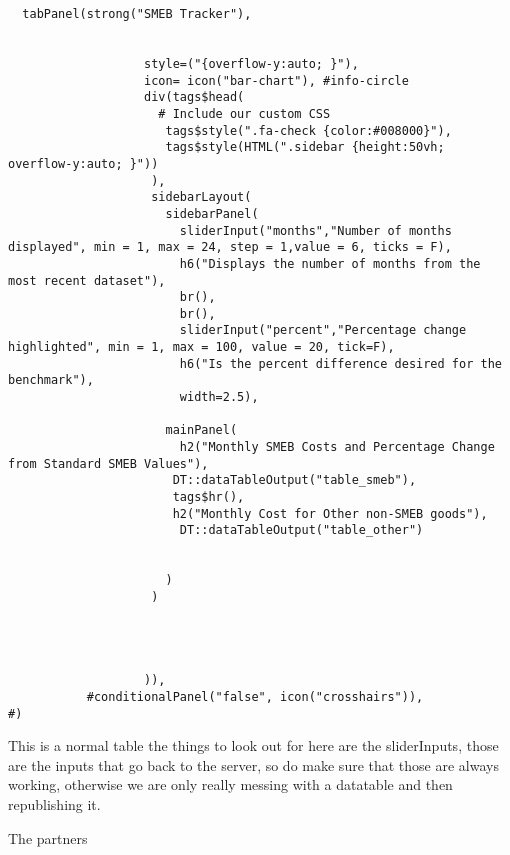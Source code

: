 \documentclass[
]{article}
\begin{document}
\begin{verbatim}
  tabPanel(strong("SMEB Tracker"),
                    
                    
                   style=("{overflow-y:auto; }"), 
                   icon= icon("bar-chart"), #info-circle
                   div(tags$head(
                     # Include our custom CSS
                      tags$style(".fa-check {color:#008000}"),
                      tags$style(HTML(".sidebar {height:50vh; overflow-y:auto; }"))
                    ),
                    sidebarLayout(
                      sidebarPanel(
                        sliderInput("months","Number of months displayed", min = 1, max = 24, step = 1,value = 6, ticks = F),
                        h6("Displays the number of months from the most recent dataset"),
                        br(),
                        br(),
                        sliderInput("percent","Percentage change highlighted", min = 1, max = 100, value = 20, tick=F),
                        h6("Is the percent difference desired for the benchmark"),
                        width=2.5),
                      
                      mainPanel(
                        h2("Monthly SMEB Costs and Percentage Change from Standard SMEB Values"),
                       DT::dataTableOutput("table_smeb"),
                       tags$hr(),
                       h2("Monthly Cost for Other non-SMEB goods"),
                        DT::dataTableOutput("table_other")
                       
                       
                      )
                    )
                    
                    
                    
                    
                   )),           
           #conditionalPanel("false", icon("crosshairs")),
#)
\end{verbatim}

This is a normal table the things to look out for here are the
sliderInputs, those are the inputs that go back to the server, so do
make sure that those are always working, otherwise we are only really
messing with a datatable and then republishing it.

The partners
\end{document}
